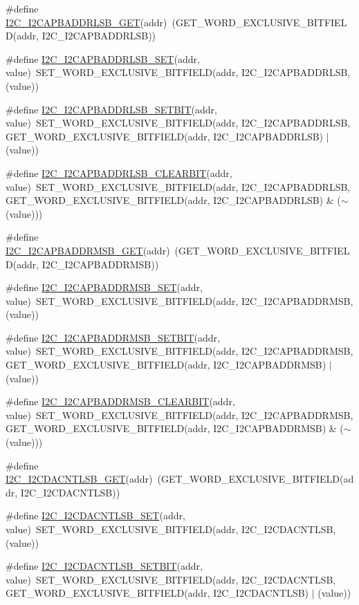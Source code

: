 \begin{DoxyCompactItemize}
\#define \hyperlink{a00557_ac7eb4cfcc847a767d0b4131ce8ba66b2}{I2C\_\-I2CAPBADDRLSB\_\-GET}(addr)~(GET\_\-WORD\_\-EXCLUSIVE\_\-BITFIELD(addr, I2C\_\-I2CAPBADDRLSB))
\item 
\#define \hyperlink{a00557_af33f32f9043bc7d3d3eb0da9becefde6}{I2C\_\-I2CAPBADDRLSB\_\-SET}(addr, value)~SET\_\-WORD\_\-EXCLUSIVE\_\-BITFIELD(addr, I2C\_\-I2CAPBADDRLSB, (value))
\item 
\#define \hyperlink{a00557_ab9025f6cad0783a9510bad7296184466}{I2C\_\-I2CAPBADDRLSB\_\-SETBIT}(addr, value)~SET\_\-WORD\_\-EXCLUSIVE\_\-BITFIELD(addr, I2C\_\-I2CAPBADDRLSB, GET\_\-WORD\_\-EXCLUSIVE\_\-BITFIELD(addr, I2C\_\-I2CAPBADDRLSB) $|$ (value))
\item 
\#define \hyperlink{a00557_ad00ecf6a4d0b8589053e51db1b557426}{I2C\_\-I2CAPBADDRLSB\_\-CLEARBIT}(addr, value)~SET\_\-WORD\_\-EXCLUSIVE\_\-BITFIELD(addr, I2C\_\-I2CAPBADDRLSB, GET\_\-WORD\_\-EXCLUSIVE\_\-BITFIELD(addr, I2C\_\-I2CAPBADDRLSB) \& ($\sim$(value)))
\item 
\#define \hyperlink{a00557_a8940d9e715350807d9a81492742472ed}{I2C\_\-I2CAPBADDRMSB\_\-GET}(addr)~(GET\_\-WORD\_\-EXCLUSIVE\_\-BITFIELD(addr, I2C\_\-I2CAPBADDRMSB))
\item 
\#define \hyperlink{a00557_aec8a2700e51ebc1c540b2efda2e04835}{I2C\_\-I2CAPBADDRMSB\_\-SET}(addr, value)~SET\_\-WORD\_\-EXCLUSIVE\_\-BITFIELD(addr, I2C\_\-I2CAPBADDRMSB, (value))
\item 
\#define \hyperlink{a00557_a2df4b9ec1bd041019b6b1c2e545391a6}{I2C\_\-I2CAPBADDRMSB\_\-SETBIT}(addr, value)~SET\_\-WORD\_\-EXCLUSIVE\_\-BITFIELD(addr, I2C\_\-I2CAPBADDRMSB, GET\_\-WORD\_\-EXCLUSIVE\_\-BITFIELD(addr, I2C\_\-I2CAPBADDRMSB) $|$ (value))
\item 
\#define \hyperlink{a00557_a50592d68b6380d8625cbaa1ae373b90c}{I2C\_\-I2CAPBADDRMSB\_\-CLEARBIT}(addr, value)~SET\_\-WORD\_\-EXCLUSIVE\_\-BITFIELD(addr, I2C\_\-I2CAPBADDRMSB, GET\_\-WORD\_\-EXCLUSIVE\_\-BITFIELD(addr, I2C\_\-I2CAPBADDRMSB) \& ($\sim$(value)))
\item 
\#define \hyperlink{a00557_a96356b3ea9acf5ae75c2389b46e214d6}{I2C\_\-I2CDACNTLSB\_\-GET}(addr)~(GET\_\-WORD\_\-EXCLUSIVE\_\-BITFIELD(addr, I2C\_\-I2CDACNTLSB))
\item 
\#define \hyperlink{a00557_a42eb65c4566b317032e595c95312ac96}{I2C\_\-I2CDACNTLSB\_\-SET}(addr, value)~SET\_\-WORD\_\-EXCLUSIVE\_\-BITFIELD(addr, I2C\_\-I2CDACNTLSB, (value))
\item 
\#define \hyperlink{a00557_afa4b14f469f1a70a8d9e8a1bcbf4340e}{I2C\_\-I2CDACNTLSB\_\-SETBIT}(addr, value)~SET\_\-WORD\_\-EXCLUSIVE\_\-BITFIELD(addr, I2C\_\-I2CDACNTLSB, GET\_\-WORD\_\-EXCLUSIVE\_\-BITFIELD(addr, I2C\_\-I2CDACNTLSB) $|$ (value))

\end{DoxyCompactItemize}
